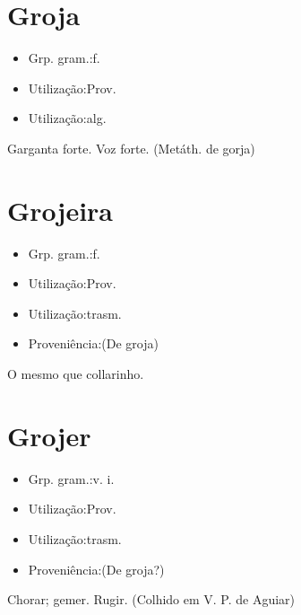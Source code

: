 \section{Groja}
\begin{itemize}
\item {Grp. gram.:f.}
\end{itemize}
\begin{itemize}
\item {Utilização:Prov.}
\end{itemize}
\begin{itemize}
\item {Utilização:alg.}
\end{itemize}
Garganta forte.
Voz forte.
(Metáth. de \textunderscore gorja\textunderscore )
\section{Grojeira}
\begin{itemize}
\item {Grp. gram.:f.}
\end{itemize}
\begin{itemize}
\item {Utilização:Prov.}
\end{itemize}
\begin{itemize}
\item {Utilização:trasm.}
\end{itemize}
\begin{itemize}
\item {Proveniência:(De \textunderscore groja\textunderscore )}
\end{itemize}
O mesmo que \textunderscore collarinho\textunderscore .
\section{Grojer}
\begin{itemize}
\item {Grp. gram.:v. i.}
\end{itemize}
\begin{itemize}
\item {Utilização:Prov.}
\end{itemize}
\begin{itemize}
\item {Utilização:trasm.}
\end{itemize}
\begin{itemize}
\item {Proveniência:(De \textunderscore groja\textunderscore ?)}
\end{itemize}
Chorar; gemer.
Rugir. (Colhido em V. P. de Aguiar)
